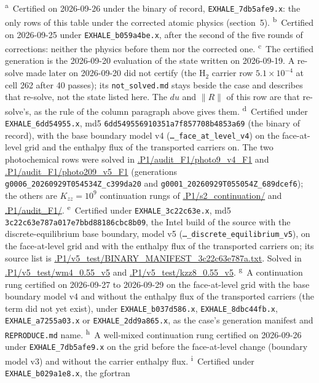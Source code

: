 \documentclass[11pt]{my_memo}
\begin{document}
\noindent
\textsuperscript{a}~Certified on 2026-09-26 under the binary of record,
\texttt{EXHALE\_7db5afe9.x}: the only rows of this table under the corrected
atomic physics (section~5).
\textsuperscript{b}~Certified on 2026-09-25 under \texttt{EXHALE\_b059a4be.x},
after the second of the five rounds of corrections: neither the physics
before them nor the corrected one.
\textsuperscript{c}~The certified generation is the 2026-09-20 evaluation of
the state written on 2026-09-19. A re-solve made later on 2026-09-20 did
not certify (the H$_2$ carrier row $5.1\times10^{-4}$ at cell 262 after 40
passes); its \texttt{not\_solved.md} stays beside the case and describes
that re-solve, not the state listed here. The $du$ and $\lVert R\rVert$ of
this row are that re-solve's, as the rule of the column paragraph above
gives them.
\textsuperscript{d}~Certified under \texttt{EXHALE\_6dd54955.x}, md5
\texttt{6dd549556910351a7f857708b4853a69} (the binary of record), with the
base boundary model v4 (\texttt{\ldots\_face\_at\_level\_v4}) on the
face-at-level grid and the enthalpy flux of the transported carriers on.
The two photochemical rows were solved in \url{.P1/audit_F1/photo9_v4_F1}
and \url{.P1/audit_F1/photo209_v5_F1} (generations
\texttt{g0006\_20260929T054534Z\_c399da20} and
\texttt{g0001\_20260929T055054Z\_689dcef6}); the others are $K_{zz}=10^{9}$
continuation rungs of \url{.P1/s2_continuation/} and \url{.P1/audit_F1/}.
\textsuperscript{e}~Certified under \texttt{EXHALE\_3c22c63e.x}, md5
\texttt{3c22c63e787a017e7bbd88186cbc8b09}, the Intel build of the source
with the discrete-equilibrium base boundary, model v5
(\texttt{\ldots\_discrete\_equilibrium\_v5}), on the face-at-level grid and
with the enthalpy flux of the transported carriers on; its source list is
\url{.P1/v5_test/BINARY_MANIFEST_3c22c63e787a.txt}. Solved in
\url{.P1/v5_test/wm4_0.55_v5} and \url{.P1/v5_test/kzz8_0.55_v5}.
\textsuperscript{g}~A continuation rung certified on 2026-09-27 to 2026-09-29
on the face-at-level grid with the base boundary model v4 and without the
enthalpy flux of the transported carriers (the term did not yet exist),
under \texttt{EXHALE\_b037d586.x}, \texttt{EXHALE\_8dbc44fb.x},
\texttt{EXHALE\_a7255a03.x} or \texttt{EXHALE\_2dd9a865.x}, as the case's
generation manifest and \texttt{REPRODUCE.md} name.
\textsuperscript{h}~A well-mixed continuation rung certified on 2026-09-26
under \texttt{EXHALE\_7db5afe9.x} on the grid before the face-at-level change
(boundary model v3) and without the carrier enthalpy flux.
\textsuperscript{i}~Certified under \texttt{EXHALE\_b029a1e8.x}, the gfortran
\end{document}
